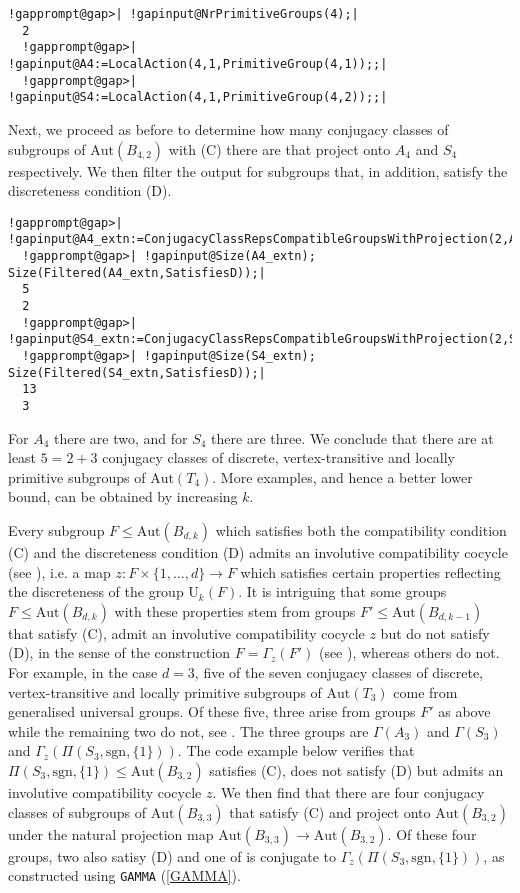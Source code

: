 \documentclass[a4paper,11pt]{report}
\begin{document}
{{ 
\begin{Verbatim}[commandchars=!@|,fontsize=\small,frame=single,label=Example]
  !gapprompt@gap>| !gapinput@NrPrimitiveGroups(4);|
  2
  !gapprompt@gap>| !gapinput@A4:=LocalAction(4,1,PrimitiveGroup(4,1));;|
  !gapprompt@gap>| !gapinput@S4:=LocalAction(4,1,PrimitiveGroup(4,2));;|
\end{Verbatim}
 Next, we proceed as before to determine how many conjugacy classes of
subgroups of $\mathrm{Aut}(B_{4,2})$ with (C) there are that project onto $A_{4}$ and $S_{4}$ respectively. We then filter the output for subgroups that, in addition,
satisfy the discreteness condition (D). 

 
\begin{Verbatim}[commandchars=!@|,fontsize=\small,frame=single,label=Example]
  !gapprompt@gap>| !gapinput@A4_extn:=ConjugacyClassRepsCompatibleGroupsWithProjection(2,A4);;|
  !gapprompt@gap>| !gapinput@Size(A4_extn); Size(Filtered(A4_extn,SatisfiesD));|
  5
  2
  !gapprompt@gap>| !gapinput@S4_extn:=ConjugacyClassRepsCompatibleGroupsWithProjection(2,S4);;|
  !gapprompt@gap>| !gapinput@Size(S4_extn); Size(Filtered(S4_extn,SatisfiesD));|
  13
  3
\end{Verbatim}
 For $A_{4}$ there are two, and for $S_{4}$ there are three. We conclude that there are at least $5=2+3$ conjugacy classes of discrete, vertex-transitive and locally primitive
subgroups of $\mathrm{Aut}(T_{4})$. More examples, and hence a better lower bound, can be obtained by increasing $k$. 

 Every subgroup $F\le\mathrm{Aut}(B_{d,k})$ which satisfies both the compatibility condition (C) and the discreteness
condition (D) admits an involutive compatibility cocycle (see \cite[Section 3.2.2]{Tor20}), i.e. a map $z:F\times\{1,\ldots,d\}\to F$ which satisfies certain properties reflecting the discreteness of the group $\mathrm{U}_{k}(F)$. It is intriguing that some groups $F\le\mathrm{Aut}(B_{d,k})$ with these properties stem from groups $F'\le\mathrm{Aut}(B_{d,k-1})$ that satisfy (C), admit an involutive compatibility cocycle $z$ but do not satisfy (D), in the sense of the construction $F=\Gamma_{z}(F')$ (see \cite[Proposition 3.26]{Tor20}), whereas others do not. For example, in the case $d=3$, five of the seven conjugacy classes of discrete, vertex-transitive and
locally primitive subgroups of $\mathrm{Aut}(T_{3})$ come from generalised universal groups. Of these five, three arise from groups $F'$ as above while the remaining two do not, see \cite[Example 4.39]{Tor20}. The three groups are $\Gamma(A_{3})$ and $\Gamma(S_{3})$ and $\Gamma_{z}(\Pi(S_{3},\mathrm{sgn},\{1\}))$. The code example below verifies that $\Pi(S_{3},\mathrm{sgn},\{1\})\le\mathrm{Aut}(B_{3,2})$ satisfies (C), does not satisfy (D) but admits an involutive compatibility
cocycle $z$. We then find that there are four conjugacy classes of subgroups of $\mathrm{Aut}(B_{3,3})$ that satisfy (C) and project onto $\mathrm{Aut}(B_{3,2})$ under the natural projection map $\mathrm{Aut}(B_{3,3})\to\mathrm{Aut}(B_{3,2})$. Of these four groups, two also satisy (D) and one of is conjugate to $\Gamma_{z}(\Pi(S_{3},\mathrm{sgn},\{1\}))$, as constructed using \texttt{GAMMA} (\ref{GAMMA}). 

}}
\end{document}

